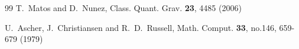 \documentclass{article}
\begin{document}
\begin{small}
\begin{thebibliography}{99}
T.~Matos and D.~Nunez,
Class. Quant. Grav. \textbf{23}, 4485 (2006)



U.~Ascher, J.~Christiansen and R.~D.~Russell,
Math. Comput. \textbf{33}, no.146, 659-679 (1979)




\end{thebibliography}

 \end{small}
\end{document}
